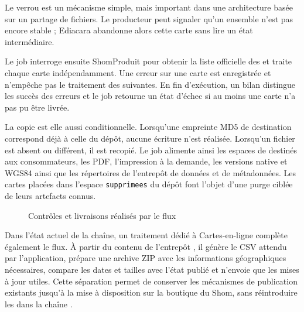 Le verrou est un mécanisme simple, mais important dans une architecture basée sur un partage de fichiers. Le producteur peut signaler qu'un ensemble n'est pas encore stable ; Ediacara abandonne alors cette carte sans lire un état intermédiaire.

Le job interroge ensuite ShomProduit pour obtenir la liste officielle des  et traite chaque carte indépendamment. Une erreur sur une carte est enregistrée et n'empêche pas le traitement des suivantes. En fin d'exécution, un bilan distingue les succès des erreurs et le job retourne un état d'échec si au moins une carte n'a pas pu être livrée.

La copie est elle aussi conditionnelle. Lorsqu'une empreinte MD5 de destination correspond déjà à celle du dépôt, aucune écriture n'est réalisée. Lorsqu'un fichier est absent ou différent, il est recopié. Le job alimente ainsi les espaces de  destinés aux consommateurs, les PDF, l'impression à la demande, les versions native et WGS84 ainsi que les répertoires de l'entrepôt de données et de métadonnées. Les cartes placées dans l'espace \texttt{supprimees} du dépôt  font l'objet d'une purge ciblée de leurs artefacts connus.

\begin{figure}[H]
\centering
{}
\caption{Contrôles et livraisons réalisés par le flux }
\label{fig:livraison-fcu}
\end{figure}

Dans l'état actuel de la chaîne, un traitement dédié à Cartes-en-ligne complète également le flux. À partir du contenu de l'entrepôt , il génère le CSV attendu par l'application, prépare une archive ZIP avec les informations géographiques nécessaires, compare les dates et tailles avec l'état publié et n'envoie que les mises à jour utiles. Cette séparation permet de conserver les mécanismes de publication existants jusqu'à la mise à disposition sur la boutique du Shom, sans réintroduire les  dans la chaîne .

